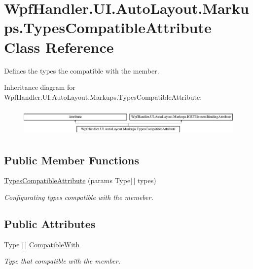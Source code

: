 \hypertarget{class_wpf_handler_1_1_u_i_1_1_auto_layout_1_1_markups_1_1_types_compatible_attribute}{}\section{Wpf\+Handler.\+U\+I.\+Auto\+Layout.\+Markups.\+Types\+Compatible\+Attribute Class Reference}
\label{class_wpf_handler_1_1_u_i_1_1_auto_layout_1_1_markups_1_1_types_compatible_attribute}


Defines the types the compatible with the member.  


Inheritance diagram for Wpf\+Handler.\+U\+I.\+Auto\+Layout.\+Markups.\+Types\+Compatible\+Attribute\+:\begin{figure}[H]
\begin{center}
\leavevmode
\includegraphics[height=1.462141cm]{d1/d67/class_wpf_handler_1_1_u_i_1_1_auto_layout_1_1_markups_1_1_types_compatible_attribute}
\end{center}
\end{figure}
\subsection*{Public Member Functions}
\begin{DoxyCompactItemize}
\item 
\mbox{\hyperlink{class_wpf_handler_1_1_u_i_1_1_auto_layout_1_1_markups_1_1_types_compatible_attribute_af5282ffa8586a2faeb03048f39f0260e}{Types\+Compatible\+Attribute}} (params Type\mbox{[}$\,$\mbox{]} types)
\begin{DoxyCompactList}\small\item\em Configurating types compatible with the memeber. \end{DoxyCompactList}\end{DoxyCompactItemize}
\subsection*{Public Attributes}
\begin{DoxyCompactItemize}
\item 
Type \mbox{[}$\,$\mbox{]} \mbox{\hyperlink{class_wpf_handler_1_1_u_i_1_1_auto_layout_1_1_markups_1_1_types_compatible_attribute_a74636e48fed1bb50fe551c1d160b68d1}{Compatible\+With}}
\begin{DoxyCompactList}\small\item\em Type that compatible with the member. \end{DoxyCompactList}\end{DoxyCompactItemize}


